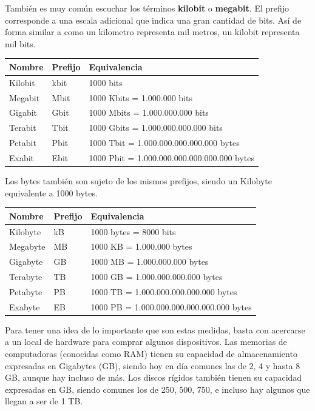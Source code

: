 También es muy común escuchar los términos \textbf{kilobit} o \textbf{megabit}.
El prefijo corresponde a una escala adicional que indica una gran cantidad de
bits. Así de forma similar a como un kilometro representa mil metros, un kilobit
representa mil bits.

\begin{tabular}{l l l}
    Nombre   &  Prefijo  & Equivalencia\\
    \hline
    Kilobit  &  kbit     & 1000 bits \\
    Megabit  &  Mbit     & 1000 Kbits = 1.000.000 bits\\
    Gigabit  &  Gbit     & 1000 Mbits = 1.000.000.000 bits\\
    Terabit  &  Tbit     & 1000 Gbits = 1.000.000.000.000 bits\\
    Petabit  &  Pbit     & 1000 Tbit = 1.000.000.000.000.000 bytes\\
    Exabit   &  Ebit     & 1000 Pbit = 1.000.000.000.000.000.000 bytes\\
\end{tabular}

Los bytes también son sujeto de los mismos prefijos, siendo un Kilobyte
equivalente a 1000 bytes.\autocite{laplante_2000}

\begin{tabular}{l l l}
    Nombre   &  Prefijo  & Equivalencia\\
    \hline
    Kilobyte  &  kB     & 1000 bytes = 8000 bits \\
    Megabyte  &  MB     & 1000 KB = 1.000.000 bytes\\
    Gigabyte  &  GB     & 1000 MB = 1.000.000.000 bytes\\
    Terabyte  &  TB     & 1000 GB = 1.000.000.000.000 bytes\\
    Petabyte  &  PB     & 1000 TB = 1.000.000.000.000.000 bytes\\
    Exabyte   &  EB     & 1000 PB = 1.000.000.000.000.000.000 bytes\\
\end{tabular}

Para tener una idea de lo importante que son estas medidas, basta con acercarse
a un local de hardware para comprar algunos dispositivos. Las memorias de
computadoras (conocidas como RAM) tienen su capacidad de almacenamiento
expresadas en Gigabytes (GB), siendo hoy en día comunes las de 2, 4 y hasta 8
GB, aunque hay incluso de más. Los discos rígidos también tienen su capacidad
expresadas en GB, siendo comunes los de 250, 500, 750, e incluso hay algunos que
llegan a ser de 1 TB.

